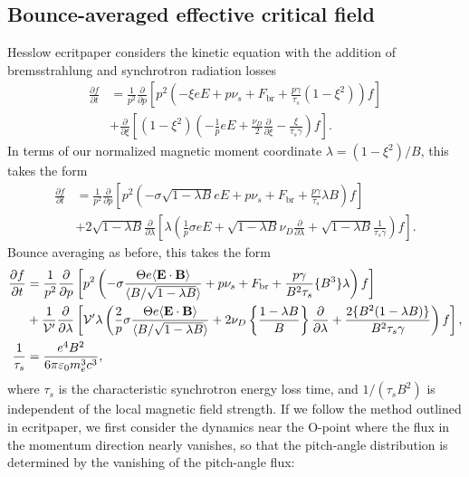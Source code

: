 \documentclass[11pt,a4paper]{article}
\newcommand{\sub}[1]{\ensuremath{_{\text{#1}}}}
\renewcommand{\b}[1]{\ensuremath{ {\bf #1 } }}
\begin{document}
\subsection{Bounce-averaged effective critical field}
Hesslow ecritpaper considers the kinetic equation with the addition of bremsstrahlung and synchrotron radiation losses
\begin{align}
\frac{\partial f}{\partial t} &= \frac{1}{p^2}\frac{\partial}{\partial p}\left[ p^2\left(-\xi eE + p\nu_s + F\sub{br}+\frac{p\gamma}{\tau_s}(1-\xi^2)\right)f\right] \nonumber \\
&+\frac{\partial}{\partial \xi}\left[ (1-\xi^2)\left( -\frac{1}{p}eE + \frac{\nu_D}{2}\frac{\partial}{\partial \xi} - \frac{\xi}{\tau_s \gamma} \right)f\right].
\end{align}
In terms of our normalized magnetic moment coordinate $\lambda = (1-\xi^2)/B$, this takes the form
\begin{align}
\frac{\partial f}{\partial t} &= \frac{1}{p^2}\frac{\partial}{\partial p}\left[ p^2\left(-\sigma\sqrt{1-\lambda B} eE + p\nu_s + F\sub{br}+\frac{p\gamma}{\tau_s}\lambda B \right)f\right] \nonumber \\
& +2\sqrt{1-\lambda B}\frac{\partial}{\partial \lambda}\left[\lambda \left( \frac{1}{p}\sigma eE  + \sqrt{1-\lambda B} \nu_D\frac{\partial}{\partial \lambda} + \sqrt{1-\lambda B} \frac{1}{\tau_s\gamma} \right)f\right].
\end{align}
Bounce averaging as before, this takes the form
\begin{align}
\frac{\partial f}{\partial t} &= \frac{1}{p^2}\frac{\partial}{\partial p}\left[ p^2\left( -\sigma\frac{\Theta e\langle\b{E}\cdot\b{B}\rangle}{\langle B/\sqrt{1-\lambda B}\rangle}+ p\nu_s + F\sub{br}+ \frac{p\gamma}{B^2\tau_s}\{B^3 \}\lambda \right)f\right] \nonumber \\
&+ \frac{1}{\mathcal{V}'}\frac{\partial}{\partial \lambda}\left[\mathcal{V}' \lambda\left(\frac{2}{p}\sigma\frac{\Theta e\langle \b{E}\cdot\b{B}\rangle}{\langle B/\sqrt{1-\lambda B}\rangle}+ 2 \nu_D\left\{\frac{1-\lambda B}{B}\right\}\frac{\partial}{\partial \lambda} + \frac{2\{B^2(1-\lambda B)\}}{B^2\tau_s \gamma }  \right)f\right], \nonumber \\ 
\frac{1}{\tau_s} &= \frac{e^4 B^2}{6\pi \varepsilon_0 m_e^3 c^3},
\end{align}
where $\tau_s$ is the characteristic synchrotron energy loss time, and $1/(\tau_s B^2)$ is independent of the local magnetic field strength. If we follow the method outlined in ecritpaper, we first consider the dynamics near the O-point where the flux in the momentum direction nearly vanishes, so that the pitch-angle distribution is determined by the vanishing of the pitch-angle flux:
\end{document}
